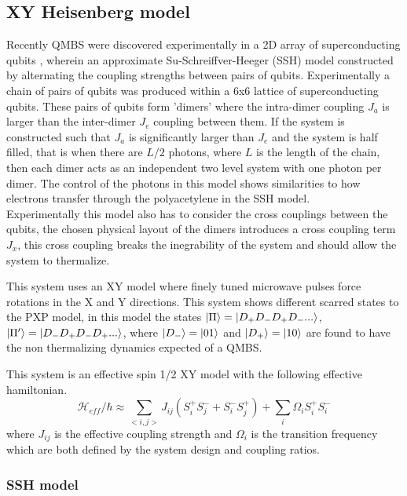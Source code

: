 \subsection{XY Heisenberg model} \label{sec:xymodel}

Recently QMBS were discovered experimentally in a 2D array of superconducting qubits \citep{zhang_many-body_2022}, wherein an approximate Su-Schreiffver-Heeger (SSH) model \cite{su_solitons_1979} constructed by alternating the coupling strengths between pairs of qubits. Experimentally a chain of pairs of qubits was produced within a 6x6 lattice of superconducting qubits. These pairs of qubits form 'dimers' where the intra-dimer coupling $J_a$ is larger than the inter-dimer $J_e$ coupling between them. If the system is constructed such that $J_a$ is significantly larger than $J_e$ and the system is half filled, that is when there are $L/2$ photons, where $L$ is the length of the chain, then each dimer acts as an independent two level system with one photon per dimer. The control of the photons in this model shows similarities to how electrons transfer through the polyacetylene in the SSH model. \\

Experimentally this model also has to consider the cross couplings between the qubits, the chosen physical layout of the dimers introduces a cross coupling term $J_x$, this cross coupling breaks the inegrability of the system and should allow the system to thermalize.

This system uses an XY model where finely tuned microwave pulses force rotations in the X and Y directions. This system shows different scarred states to the PXP model, in this model the states $\ket{\Pi}=\ket{D_+D_-D_+D_-...}$, $\ket{\Pi '}=\ket{D_-D_+D_-D_+...}$, where $\ket{D_-} = \ket{01}$ and $ \ket{D_+}=\ket{10}$ are found to have the non thermalizing dynamics expected of a QMBS. 

This system is an effective spin 1/2 XY model with the following effective hamiltonian. 
\begin{equation} \label{eq:eff_hamiltonian}
\mathcal{H}_{eff} /\hbar \approx \sum_{<i,j>}J_{ij} (S^+_iS^-_j + S^-_iS^+_j) +\sum_i \Omega_i S^+_iS_i^-
\end{equation}
where $J_{ij}$ is the effective coupling strength and $\Omega_i$ is the transition frequency which are both defined by the system design and coupling ratios. 


\subsubsection{SSH model}

